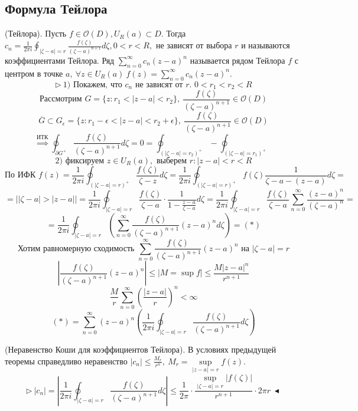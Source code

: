 \subsection{Формула Тейлора}
 (Тейлора). Пусть $f \in \mathcal{O}(D), U_R(a) \subset D$. Тогда $c_n = \frac{1}{2\pi i} \oint_{|\zeta - a|=r}\frac{f(\zeta)}{(\zeta-a)^{n+1}}d\zeta, 0<r<R,$
 не зависят от выбора $r$ и называются коэффициентами Тейлора. Ряд $\sum_{n=0}^\infty c_n(z-a)^n$ называется рядом Тейлора $f$ с центром в точке $a, \ \forall z \in U_R(a) \ f(z) = \sum_{n=0}^\infty c_n (z-a)^n$.
\[\triangleright \ 1) \text{ Покажем, что $c_n$ не зависят от $r$. } 0<r_1<r_2<R\]
\[\text{Рассмотрим } G = \{z: r_1 <|z-a|<r_2\}, \ \frac{f(\zeta)}{(\zeta-a)^{n+1}} \in \mathcal{O}(D)\]
\[\overline{G} \subset G_\epsilon = \{z : r_1-\epsilon < |z-a| < r_2 + \epsilon\}, \ \frac{f(\zeta)}{(\zeta-a)^{n+1}}\in \mathcal{O}(D)\]
\[\overset{\text{ИТК}}{\Rightarrow} \oint_{\partial G^+}\frac{f(\zeta)}{(\zeta-a)^{n+1}}d\zeta = 0 = \oint_{(|\zeta-a|=r_2)^+} - \oint_{(|\zeta-a|=r_1)^+}\]
\[2) \text{ фиксируем } z \in U_R(a), \text{ выберем } r: |z-a|<r<R\]
\[\text{По ИФК } f(z) = \frac{1}{2\pi i} \oint_{(|\zeta-a|=r)^+} \frac{f(\zeta)}{\zeta-z}d\zeta = \frac{1}{2\pi i} \oint_{(|\zeta-a|=r)^+} f(\zeta) \frac{1}{\zeta -a - (z-a)} d\zeta =\] 
\[=\left||\zeta-a|>|z-a|\right| = \frac{1}{2\pi i} \oint_{|\zeta-a|=r} \frac{f(\zeta)}{\zeta - a} \cdot \frac{1}{1-\frac{z-a}{\zeta-a}} d\zeta = \frac{1}{2\pi i} \oint_{|\zeta-a|=r} \frac{f(\zeta)}{\zeta-a} \sum_{n=0}^\infty \frac{(z-a)^n}{(\zeta-a)^n}=\]
\[= \frac{1}{2\pi i} \oint_{|\zeta-a|=r} \left( \sum_{n=0}^\infty \frac{f(\zeta)}{(\zeta-a)^{n+1}} (z-a)^n d \zeta \right) = (*)\]
\[\text{Хотим равномерную сходимость } \sum_{n=0}^\infty \frac{f(\zeta)}{(\zeta-a)^{n+1}}(z-a)^n \text{ на } |\zeta-a|=r\]
\[\left|\frac{f(\zeta)}{(\zeta-a)^{n+1}}(z-a)^n\right| \leq |M = \sup f| \leq \frac{M |z-a|^n}{r^{n+1}}\]
\[\frac{M}{r} \sum_{n=0}^\infty \left(\frac{|z-a|}{r}\right)^n < \infty\]
\[(*) = \sum_{n=0}^\infty (z-a)^n \left(\frac{1}{2\pi i} \oint_{|\zeta-a|=r} \frac{f(\zeta)}{(\zeta-a)^{n+1}}d\zeta\right)\]

 (Неравенство Коши для коэффициентов Тейлора). 
В условиях предыдущей теоремы справедливо неравенство $|c_n| \leq \frac{M_r}{r^n}, \ M_r = \underset{|z-a|=r}{\sup} f(z)$.
\[\triangleright \ |c_n| = \left|\frac{1}{2\pi i} \oint_{|\zeta-a|=r} \frac{f(\zeta)}{(\zeta-a)^{n+1}}d\zeta\right| \leq \frac{1}{2\pi} \cdot \frac{\underset{|\zeta-a|=r}{\sup}|f(\zeta)|}{r^{n+1}} \cdot 2\pi r \ \blacktriangleleft\]

